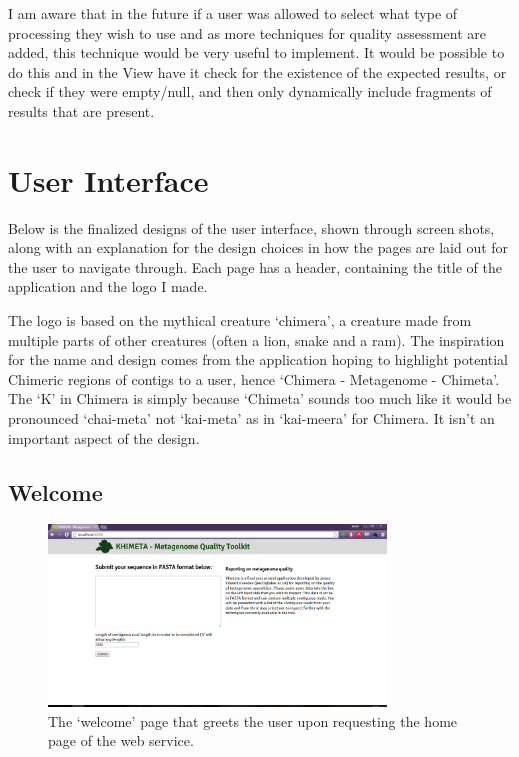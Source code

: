 I am aware that in the future if a user was allowed to select what type of processing they wish to use and as more techniques for quality assessment are added, this technique would be very useful to implement. It would be possible to do this and in the View have it check for the existence of the expected results, or check if they were empty/null, and then only dynamically include fragments of results that are present. 

\section{User Interface}
Below is the finalized designs of the user interface, shown through screen shots, along with an explanation for the design choices in how the pages are laid out for the user to navigate through. Each page has a header, containing the title of the application and the logo I made. 

The logo is based on the mythical creature `chimera', a creature made from multiple parts of other creatures (often a lion, snake and a ram). The inspiration for the name and design comes from the application hoping to highlight potential Chimeric regions of contigs to a user, hence `Chimera - Metagenome - Chimeta'. The `K' in Chimera is simply because `Chimeta' sounds too much like it would be pronounced `chai-meta' not `kai-meta' as in `kai-meera' for Chimera. It isn't an important aspect of the design.

\subsection{Welcome}
\begin{figure}[H]
\centering
\includegraphics[width=0.8\textwidth]{images/ui1}
\caption{The `welcome' page that greets the user upon requesting the home page of the web service.}
\end{figure}

